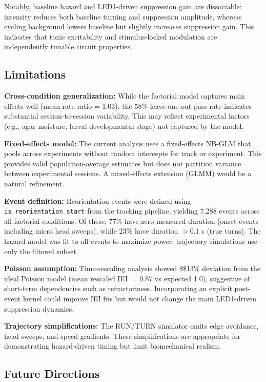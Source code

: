\documentclass[
  11pt,
  letterpaper,
]{article}
\begin{document}
Notably, baseline hazard and LED1-driven suppression gain are
dissociable: intensity reduces both baseline turning and suppression
amplitude, whereas cycling background lowers baseline but slightly
increases suppression gain. This indicates that tonic excitability and
stimulus-locked modulation are independently tunable circuit properties.

\subsection{Limitations}

\textbf{Cross-condition generalization:} While the factorial model
captures main effects well (mean rate ratio = 1.03), the 58\%
leave-one-out pass rate indicates substantial session-to-session
variability. This may reflect experimental factors (e.g., agar moisture,
larval developmental stage) not captured by the model.

\textbf{Fixed-effects model:} The current analysis uses a fixed-effects
NB-GLM that pools across experiments without random intercepts for track
or experiment. This provides valid population-average estimates but does
not partition variance between experimental sessions. A mixed-effects
extension (GLMM) would be a natural refinement.

\textbf{Event definition:} Reorientation events were defined using
\texttt{is\_reorientation\_start} from the tracking pipeline, yielding
7,288 events across all factorial conditions. Of these, 77\% have zero
measured duration (onset events including micro head sweeps), while 23\%
have duration \(> 0.1\) s (true turns). The hazard model was fit to all
events to maximize power; trajectory simulations use only the filtered
subset.

\textbf{Poisson assumption:} Time-rescaling analysis showed
\$\approx\$13\% deviation from the ideal Poisson model (mean rescaled
IEI \(= 0.87\) vs expected 1.0), suggestive of short-term dependencies
such as refractoriness. Incorporating an explicit post-event kernel
could improve IEI fits but would not change the main LED1-driven
suppression dynamics.

\textbf{Trajectory simplifications:} The RUN/TURN simulator omits edge
avoidance, head sweeps, and speed gradients. These simplifications are
appropriate for demonstrating hazard-driven timing but limit
biomechanical realism.

\subsection{Future Directions}
\end{document}
